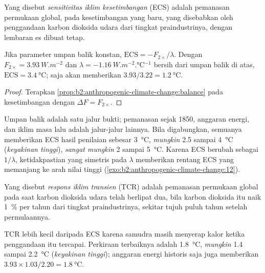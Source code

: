 \begin{definition}\label{def:b2:anthropogenic-climate-change:ecs}
Yang disebut \emph{sensitivitas iklim kesetimbangan} (ECS) adalah
pemanasan permukaan global, pada kesetimbangan yang baru, yang disebabkan oleh penggandaan karbon dioksida
udara dari tingkat praindustrinya, dengan lembaran es dibuat tetap.
\end{definition}

\begin{proposition}\label{prop:b2:anthropogenic-climate-change:ecs}
Jika parameter umpan balik konstan, $\text{ECS} = -F_{2\times}/\lambda$. Dengan $F_{2\times} =
\qty{3.93}{W.m^{-2}}$ dan $\lambda = \qty{-1.16}{W.m^{-2}.\celsius^{-1}}$ bersih dari umpan balik
di atas, $\text{ECS} = \qty{3.4}{\celsius}$;  saja akan memberikan $3.93/3.22 =
\qty{1.2}{\celsius}$.
\end{proposition}
\begin{proof}
Terapkan \cref{prop:b2:anthropogenic-climate-change:balance} pada kesetimbangan dengan $\Delta F =
F_{2\times}$.
\end{proof}

Umpan balik adalah satu jalur bukti; pemanasan sejak 1850, anggaran energi, dan iklim
masa lalu adalah jalur-jalur lainnya. Bila digabungkan, semuanya memberikan ECS hasil penilaian sebesar \qty{3}{\celsius}, \emph{mungkin}
2.5 sampai \qty{4}{\celsius} (\emph{keyakinan tinggi}), \emph{sangat mungkin} 2 sampai \qty{5}{\celsius}.
Karena ECS berubah sebagai $1/\lambda$, ketidakpastian yang simetris pada $\lambda$ memberikan rentang
ECS yang memanjang ke arah nilai tinggi (\cref{exo:b2:anthropogenic-climate-change:12}).

\begin{definition}\label{def:b2:anthropogenic-climate-change:tcr}
Yang disebut \emph{respons iklim transien} (TCR) adalah pemanasan permukaan
global pada saat karbon dioksida udara telah berlipat dua, bila karbon dioksida itu naik \qty{1}{\percent}
per tahun dari tingkat praindustrinya, sekitar tujuh puluh tahun setelah permulaannya.
\end{definition}

TCR lebih kecil daripada ECS karena samudra masih menyerap kalor ketika penggandaan itu
tercapai. Perkiraan terbaiknya adalah \qty{1.8}{\celsius}, \emph{mungkin} 1.4 sampai \qty{2.2}{\celsius}
(\emph{keyakinan tinggi}); anggaran energi historis saja juga memberikan $3.93 \times 1.03/2.20 =
\qty{1.8}{\celsius}$.


